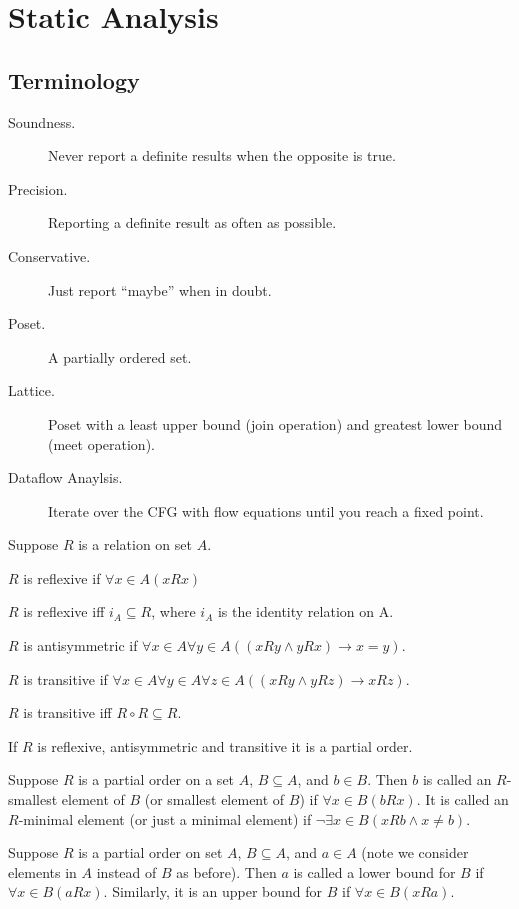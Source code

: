 \chapter{Static Analysis}

\section{Terminology}

\begin{description}
  \item[Soundness.] Never report a definite results when the opposite is true.
  \item[Precision.] Reporting a definite result as often as possible.
  \item[Conservative.] Just report ``maybe'' when in doubt.
  \item[Poset.] A partially ordered set.
  \item[Lattice.] Poset with a least upper bound (join operation) and greatest
                  lower bound (meet operation).
  \item[Dataflow Anaylsis.] Iterate over the CFG with flow equations until you
                            reach a fixed point.
\end{description}

Suppose $R$ is a relation on set $A$.

$R$ is reflexive if $\forall x \in A (x R x)$

$R$ is reflexive iff $i_A \subseteq R$, where $i_A$ is the identity  relation
on A.

$R$ is antisymmetric if $\forall x \in A \forall y \in A ((x R y \land y R x)
\rightarrow x = y)$.

$R$ is transitive if $\forall x \in A \forall y \in A \forall z \in A
((x R y \land y R z) \rightarrow x R z)$.

$R$ is transitive iff $R \circ R \subseteq R$.

If $R$ is reflexive, antisymmetric and transitive it is a partial order.

Suppose $R$ is a partial order on a set $A$, $B \subseteq A$, and $b \in B$.
Then $b$ is called an $R$-smallest element of $B$ (or smallest element of $B$)
if $\forall x \in B (b R x)$. It is called  an $R$-minimal element (or just a
minimal element) if $\lnot \exists x \in B (x R b \land x \neq b)$.

Suppose $R$ is a partial order on set $A$, $B \subseteq A$, and $a \in A$ (note
we consider elements in $A$ instead of $B$ as before). Then $a$ is called a
lower bound for $B$ if $\forall x \in B (a R x)$. Similarly, it is an upper
bound for $B$ if $\forall x \in B (x R a)$.

